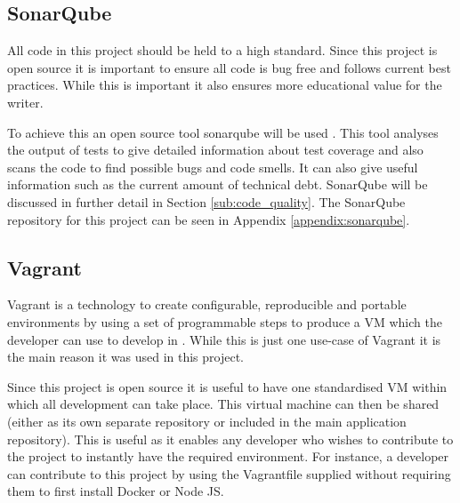 \subsection{SonarQube}
\label{sub:sonarqube-technologies}
All code in this project should be held to a high standard. Since this project is open source it is important to ensure all code is bug free and follows current best practices. While this is important it also ensures more educational value for the writer.

To achieve this an open source tool \gls{sonarqube} will be used \citep{Sonar2016}. This tool analyses the output of tests to give detailed information about test coverage and also scans the code to find possible bugs and \gls{code smell}s. It can also give useful information such as the current amount of \gls{technical debt}. SonarQube will be discussed in further detail in Section \ref{sub:code_quality}. The SonarQube repository for this project can be seen in Appendix \ref{appendix:sonarqube}.

\subsection{Vagrant}
\label{sub:vagrant}
Vagrant is a technology to create configurable, reproducible and portable environments by using a set of programmable steps to produce a \gls{VM} which the developer can use to develop in \citep{Vagrant2017}. While this is just one use-case of Vagrant it is the main reason it was used in this project. 

Since this project is open source it is useful to have one standardised VM within which all development can take place. This virtual machine can then be shared (either as its own separate repository or included in the main application repository). This is useful as it enables any developer who wishes to contribute to the project to instantly have the required environment. For instance, a developer can contribute to this project by using the \gls{Vagrantfile} supplied without requiring them to first install Docker or Node JS.

